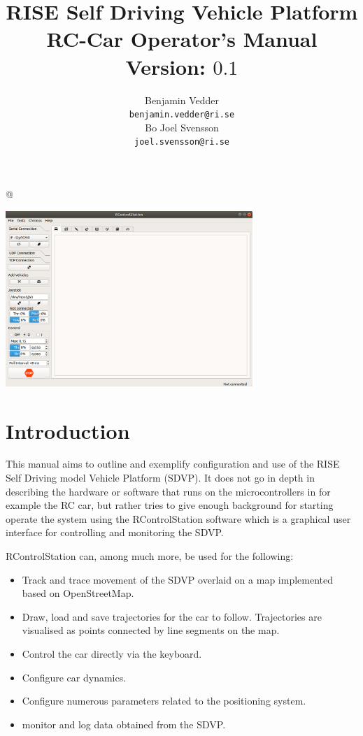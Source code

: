 \documentclass[12pt]{article} %
\makeatletter
\renewcommand{\maketitle}{\bgroup\setlength{\parindent}{0pt}
  \thispagestyle{empty}
  \begin{flushleft}
    \textbf{\@title}

    \vspace{3cm}
    
    \@author
    
    \begin{center}
      \includegraphics[width=0.7\textwidth]{./screens/RControlStation1.png}
    \end{center}
      
  \end{flushleft}\egroup
}
\newcommand{\GUIDEVERSION}[0]{$0.1$}
\newcommand{\GUIDETITLE}[0]{RISE Self Driving Vehicle Platform \newline \noindent
  RC-Car Operator's Manual \newline \noindent Version: \GUIDEVERSION{}}
\makeatother
\begin{document}
\title{\GUIDETITLE}


\author{Benjamin Vedder\\ \texttt{benjamin.vedder@ri.se}\\ \vspace{5mm} Bo Joel Svensson\\ \texttt{joel.svensson@ri.se}} 

\lstMakeShortInline[]@

\maketitle



\newpage
\tableofcontents{}
\newpage


\section{Introduction}

This manual aims to outline and exemplify configuration and use of the
RISE Self Driving model Vehicle Platform (SDVP). It does not go in
depth in describing the hardware or software that runs on the
microcontrollers in for example the RC car, but rather tries to give
enough background for starting operate the system using the
RControlStation software which is a graphical user interface for
controlling and monitoring the SDVP.

RControlStation can, among much more, be used for the following:
\begin{itemize}
\item Track and trace movement of the SDVP overlaid on a map
  implemented based on OpenStreetMap.
\item Draw, load and save trajectories for the car to
  follow. Trajectories are visualised as points connected by line
  segments on the map.
\item Control the car directly via the keyboard.
\item Configure car dynamics.
\item Configure numerous parameters related to the positioning system.
\item monitor and log data obtained from the SDVP. 
\end{itemize} 
\end{document}
